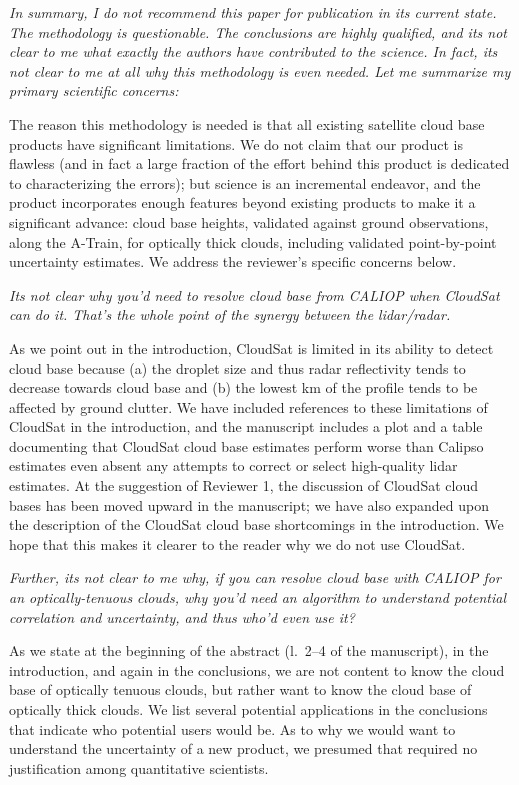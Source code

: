 \documentclass[12pt,a4paper]{responses}
\begin{document}
\textit{In summary, I do not recommend this paper for publication in its current state.  The
methodology is questionable. The conclusions are highly qualified, and its not clear to
me what exactly the authors have contributed to the science. In fact, its not clear to me
at all why this methodology is even needed.  Let me summarize my primary scientific
concerns:}

The reason this methodology is needed is that all existing satellite cloud base
products have significant limitations.  We do not claim that our product is
flawless (and in fact a large fraction of the effort behind this product is
dedicated to characterizing the errors); but science is an incremental endeavor,
and the product incorporates enough features beyond existing products to make it
a significant advance: cloud base heights, validated against ground
observations, along the A-Train, for optically thick clouds, including validated
point-by-point uncertainty estimates.  We address the reviewer's specific
concerns below.

\textit{Its not clear why you’d need to resolve cloud base from CALIOP when CloudSat can
do it. That’s the whole point of the synergy between the lidar/radar.} 


As we point out in the introduction, CloudSat is limited in its ability to
detect cloud base because (a) the droplet size and thus radar reflectivity tends
to decrease towards cloud base and (b) the lowest km of the profile tends to be
affected by ground clutter.  We have included references to these
limitations of CloudSat in the introduction, and the manuscript includes a plot
and a table documenting that CloudSat cloud base estimates perform worse than
Calipso estimates even absent any attempts to correct or select high-quality
lidar estimates.  At the suggestion of Reviewer 1, the discussion of CloudSat
cloud bases has been moved upward in the manuscript; we have also expanded upon
the description of the CloudSat cloud base shortcomings in the introduction.  We
hope that this makes it clearer to the reader why we do not use CloudSat.

\textit{Further, its not clear to me why, if you can resolve cloud base with
  CALIOP for an optically-tenuous clouds, why you’d need an algorithm to
  understand potential correlation and uncertainty, and thus who’d even use it?}

As we state at the beginning of the abstract (l.~2--4 of the manuscript), in the
introduction, and again in the conclusions, we are not content to know the cloud
base of optically tenuous clouds, but rather want to know the cloud base of
optically thick clouds.  We list several potential applications in the
conclusions that indicate who potential users would be.  As to why we would want
to understand the uncertainty of a new product, we presumed that required no
justification among quantitative scientists. 
\end{document}
